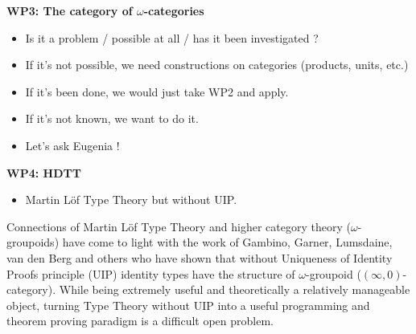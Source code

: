 








{\bf WP3: The category of $\omega$-categories}
\begin{itemize}
\item Is it a problem  / possible at all / has it been investigated ? 
\item If it's not possible, we need constructions on categories
  (products, units, etc.) 
\item If it's been done, we would just take WP2 and apply.
\item If it's not known, we want to do it. 
\item Let's ask Eugenia !
\end{itemize}


{\bf WP4: HDTT}
\begin{itemize}
\item Martin L\"of Type Theory but without UIP.
\end{itemize}
Connections of Martin L\"of Type Theory and higher category theory
($\omega$-groupoids) have come to light with the work of Gambino,
Garner, Lumsdaine, van den Berg and others \cite{} who have shown
that without Uniqueness of Identity
Proofs principle (UIP) identity types have the structure of
$\omega$-groupoid ($(\infty,0)$-category). While being extremely
useful and theoretically a relatively manageable object, turning Type
Theory without UIP into a useful programming and theorem proving
paradigm is a difficult open problem. 

